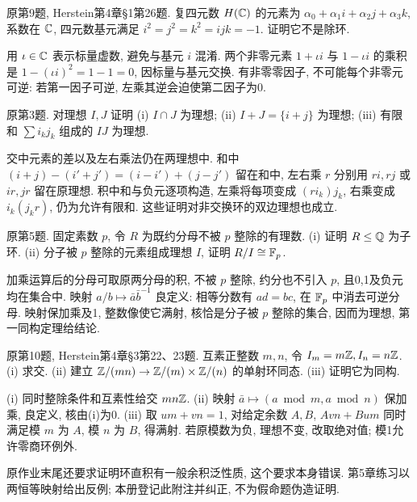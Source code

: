 \begin{exercise}原第9题, Herstein第4章\S1第26题. 复四元数 $H(\mathbb C)$ 的元素为 $\alpha_0+\alpha_1i+\alpha_2j+\alpha_3k$, 系数在 $\mathbb C$, 四元数基元满足 $i^2=j^2=k^2=ijk=-1$. 证明它不是除环.\end{exercise}
\begin{solution}
用 $\iota\in\mathbb C$ 表示标量虚数, 避免与基元 $i$ 混淆. 两个非零元素 $1+\iota i$ 与 $1-\iota i$ 的乘积是 $1-(\iota i)^2=1-1=0$, 因标量与基元交换. 有非零零因子, 不可能每个非零元可逆: 若第一因子可逆, 左乘其逆会迫使第二因子为0.
\end{solution}
\begin{exercise}原第3题. 对理想 $I,J$ 证明 (i) $I\cap J$ 为理想; (ii) $I+J=\{i+j\}$ 为理想; (iii) 有限和 $\sum i_kj_k$ 组成的 $IJ$ 为理想.\end{exercise}
\begin{solution}
交中元素的差以及左右乘法仍在两理想中. 和中 $(i+j)-(i'+j')=(i-i')+(j-j')$ 留在和中, 左右乘 $r$ 分别用 $ri,rj$ 或 $ir,jr$ 留在原理想. 积中和与负元逐项构造, 左乘将每项变成 $(ri_k)j_k$, 右乘变成 $i_k(j_kr)$, 仍为允许有限和. 这些证明对非交换环的双边理想也成立.
\end{solution}
\begin{exercise}原第5题. 固定素数 $p$, 令 $R$ 为既约分母不被 $p$ 整除的有理数. (i) 证明 $R\le\mathbb Q$ 为子环. (ii) 分子被 $p$ 整除的元素组成理想 $I$, 证明 $R/I\cong\mathbb F_p$.\end{exercise}
\begin{solution}
加乘运算后的分母可取原两分母的积, 不被 $p$ 整除, 约分也不引入 $p$, 且0,1及负元均在集合中. 映射 $a/b\mapsto\bar a\bar b^{-1}$ 良定义: 相等分数有 $ad=bc$, 在 $\mathbb F_p$ 中消去可逆分母. 映射保加乘及1, 整数像使它满射, 核恰是分子被 $p$ 整除的集合, 因而为理想, 第一同构定理给结论.
\end{solution}
\begin{exercise}原第10题, Herstein第4章\S3第22、23题. 互素正整数 $m,n$, 令 $I_m=m\mathbb Z,I_n=n\mathbb Z$. (i) 求交. (ii) 建立 $\mathbb Z/(mn)\to\mathbb Z/(m)\times\mathbb Z/(n)$ 的单射环同态. (iii) 证明它为同构.\end{exercise}
\begin{solution}
(i) 同时整除条件和互素性给交 $mn\mathbb Z$. (ii) 映射 $\bar a\mapsto(a\bmod m,a\bmod n)$ 保加乘, 良定义, 核由(i)为0. (iii) 取 $um+vn=1$, 对给定余数 $A,B$, $Avn+Bum$ 同时满足模 $m$ 为 $A$, 模 $n$ 为 $B$, 得满射. 若原模数为负, 理想不变, 改取绝对值; 模1允许零商环例外.
\end{solution}
原作业末尾还要求证明环直积有一般余积泛性质, 这个要求本身错误. 第5章练习以两恒等映射给出反例; 本册登记此附注并纠正, 不为假命题伪造证明.
